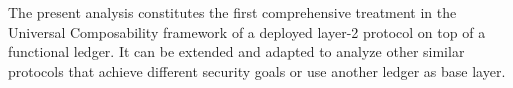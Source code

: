   The present analysis constitutes the first comprehensive treatment in the
  Universal Composability framework of a deployed layer-2 protocol on top of a
  functional ledger. It can be extended and adapted to analyze other similar
  protocols that achieve different security goals or use another ledger as base
  layer.

